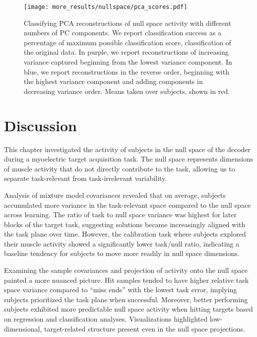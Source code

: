 \documentclass[../main.tex]{subfiles}
\begin{document}
  \begin{figure}[H]%
    \centering
    \texttt{[image: more\_results/nullspace/pca\_scores.pdf]}
    \caption[Classification of PCA reconstructions]{Classifying PCA reconstructions of null space activity with different numbers of PC components. We report classification success as a percentage of maximum possible classification score, classification of the original data. In purple, we report reconstructions of increasing variance captured beginning from the lowest variance component. In blue, we report reconstructions in the reverse order, beginning with the highest variance component and adding components in decreasing variance order. Means taken over subjects, shown in red.}\label{fig:pca_scores}
  \end{figure}

  




  \section{Discussion}

  This chapter investigated the activity of subjects in the null space of the decoder during a myoelectric target acquisition task. The null space represents dimensions of muscle activity that do not directly contribute to the task, allowing us to separate task-relevant from task-irrelevant variability.

  Analysis of mixture model covariances revealed that on average, subjects accumulated more variance in the task-relevant space compared to the null space across learning. The ratio of task to null space variance was highest for later blocks of the target task, suggesting solutions became increasingly aligned with the task plane over time. However, the calibration task where subjects explored their muscle activity showed a significantly lower task/null ratio, indicating a baseline tendency for subjects to move more readily in null space dimensions.

  Examining the sample covariances and projection of activity onto the null space painted a more nuanced picture. Hit samples tended to have higher relative task space variance compared to ``miss ends'' with the lowest task error, implying subjects prioritized the task plane when successful. Moreover, better performing subjects exhibited more predictable null space activity when hitting targets based on regression and classification analyses. Visualizations highlighted low-dimensional, target-related structure present even in the null space projections.
\end{document}
